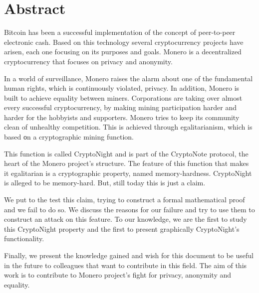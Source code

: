 %
%
\restoregeometry

\thispagestyle{empty}
\chapter*{Abstract}
Bitcoin has been a successful implementation of the concept of peer-to-peer electronic cash. Based on this technology several cryptocurrency projects have arisen, each one focusing on its purposes and goals. Monero is a decentralized cryptocurrency that focuses on privacy and anonymity.

In a world of surveillance, Monero raises the alarm about one of the fundamental human rights, which is continuously violated, privacy. In addition, Monero is built to achieve equality between miners. Corporations are taking over almost every successful cryptocurrency, by making mining participation harder and harder for the hobbyists and supporters. Monero tries to keep its community clean of unhealthy competition. This is achieved through egalitarianism, which is based οn a cryptographic mining function.

This function is called CryptoNight and is part of the CryptoNote protocol, the heart of the Monero project's structure. The feature of this function that makes it egalitarian is a cryptographic property, named memory-hardness. CryptoNight is alleged to be memory-hard. But, still today this is just a claim.

We put to the test this claim, trying to construct a formal mathematical proof and we fail to do so. We discuss the reasons for our failure and try to use them to construct an attack on this feature. To our knowledge, we are the first to study this CryptoNight property and the first to present graphically CryptoNight's functionality.

Finally, we present the knowledge gained and wish for this document to be useful in the future to colleagues that want to contribute in this field. The aim of this work is to contribute to Monero project's fight for privacy, anonymity and equality.
\clearpage
%
%
\thispagestyle{empty}
\null
\clearpage
